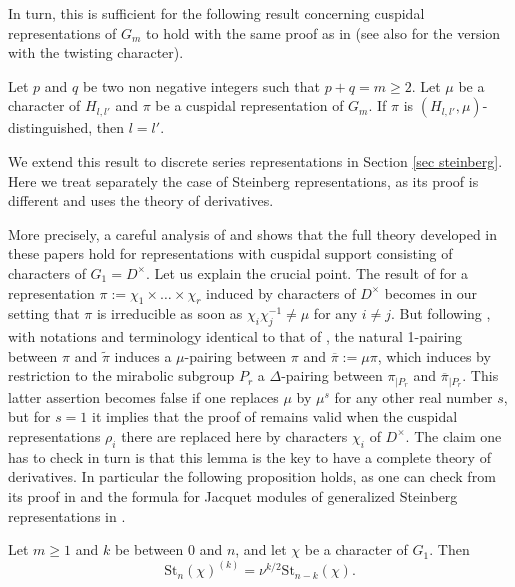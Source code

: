 \documentclass[11pt,letterpaper]{amsart}
\def\St{\mathrm{St}}
\theoremstyle{plain}
\numberwithin{equation}{section}
\begin{document}
In turn, this is sufficient for the following result concerning cuspidal representations of $G_m$ to hold with the same proof as in \cite{MatCRAS} (see also \cite{MatCMRL} for the version with the twisting character).

\begin{prop}\label{prop cusp p=q}
Let $p$ and $q$ be two non negative integers such that $p+q=m\geq 2$. Let $\mu$ be a character of $H_{l,l'}$ and $\pi$ be a cuspidal representation of $G_m$. If 
 $\pi$ is $(H_{l,l'},\mu)$-distinguished, then $l=l'$.
\end{prop}

We extend this result to discrete series representations in Section \ref{sec steinberg}. Here we treat separately the case of 
Steinberg representations, as its proof is different and uses the theory of derivatives. 

More precisely, a careful analysis of \cite{BZ2} and \cite{Z} shows that the full theory developed in these papers hold for representations with cuspidal support consisting of characters of $G_1=D^\times$. %
Let us explain the crucial point. The result of \cite[Theorem 4.2]{BZ2} for a representation $\pi:=\chi_1\times \dots \times \chi_r$ induced by characters of $D^\times$ becomes in our setting that $\pi$ is irreducible as soon as $\chi_i\chi_j^{-1}\neq \mu$ for any $i\neq j$. But following \cite{BZ2}, with notations and terminology identical to that of \cite[Section 4.8]{BZ2}, the natural 1-pairing between $\pi$ and $\tilde{\pi}$ induces a $\mu$-pairing between $\pi$ and $\overline{\pi}:=\mu \pi$, which induces by restriction to the mirabolic subgroup $P_r$ a $\Delta$-pairing between $\pi_{|P_r}$ and 
$\overline{\pi}_{|P_r}$. This latter assertion becomes false if one replaces $\mu$ by $\mu^s$ for any other real number $s$, but for $s=1$ it implies that the proof of \cite[Lemma 4.7]{BZ2} remains valid when the cuspidal representations $\rho_i$ there are replaced here by characters $\chi_i$ of $D^\times$. The claim one has to check in turn is that this lemma is the key to have a complete theory of derivatives. In particular the following proposition holds, as one can check from its proof in \cite[Proposition 9.5]{Z} and the formula for Jacquet modules of generalized Steinberg representations in \cite[Proposition 3.1]{Tglna}. 

\begin{prop}
Let $m\geq 1$ and $k$ be between $0$ and $n$, and let $\chi$ be a character of $G_1$. Then 
\[\St_n(\chi)^{(k)}=\nu^{k/2}\St_{n-k}(\chi).\]
\end{prop}
\end{document}
